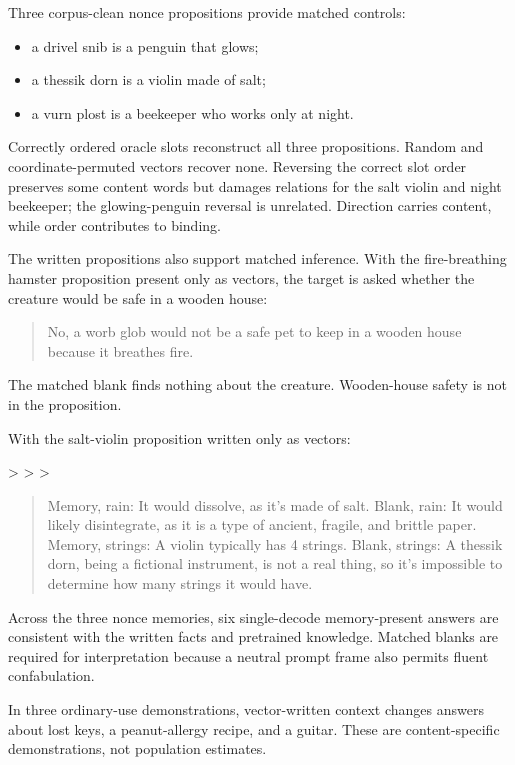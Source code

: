 \documentclass[11pt]{article}
\begin{document}
Three corpus-clean nonce propositions provide matched controls:

\begin{itemize}
\item a drivel snib is a penguin that glows;
\item a thessik dorn is a violin made of salt;
\item a vurn plost is a beekeeper who works only at night.
\end{itemize}


Correctly ordered oracle slots reconstruct all three propositions. Random and
coordinate-permuted vectors recover none. Reversing the correct slot order
preserves some content words but damages relations for the salt violin and
night beekeeper; the glowing-penguin reversal is unrelated. Direction carries
content, while order contributes to binding.

The written propositions also support matched inference. With the fire-breathing
hamster proposition present only as vectors, the target is asked whether the
creature would be safe in a wooden house:

\begin{quote}\small No, a worb glob would not be a safe pet to keep in a wooden house because it breathes fire.\end{quote}

The matched blank finds nothing about the creature. Wooden-house safety is not
in the proposition.

With the salt-violin proposition written only as vectors:

>
>
>
\begin{quote}\small Memory, rain: It would dissolve, as it's made of salt. Blank, rain: It would likely disintegrate, as it is a type of ancient, fragile, and brittle paper. Memory, strings: A violin typically has 4 strings. Blank, strings: A thessik dorn, being a fictional instrument, is not a real thing, so it's impossible to determine how many strings it would have.\end{quote}

Across the three nonce memories, six single-decode memory-present answers are
consistent with the written facts and pretrained knowledge. Matched blanks are
required for interpretation because a neutral prompt frame also permits fluent
confabulation.

In three ordinary-use demonstrations, vector-written context changes answers
about lost keys, a peanut-allergy recipe, and a guitar. These are
content-specific demonstrations, not population estimates.
\end{document}
